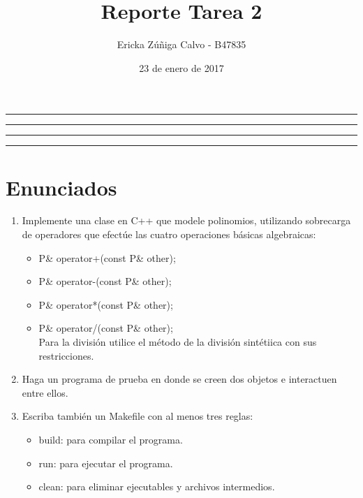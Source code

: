 \documentclass[11pt]{article}
\title{Reporte Tarea 2}
\author{Ericka Z\'u\~niga Calvo - B47835}
\date{23 de enero de 2017}
\begin{document}
\maketitle
\hrule
\hrule
\tableofcontents
\hspace{5mm}
\hrule
\hrule


\section{Enunciados}

\begin{enumerate}
\item Implemente una clase en C++ que modele polinomios, utilizando sobrecarga de operadores que efectúe las cuatro operaciones básicas algebraicas:

\begin{itemize}
\item P\& operator+(const P\& other);
\item P\& operator-(const P\& other);
\item P\& operator*(const P\& other);
\item P\& operator/(const P\& other);\\
Para la divisi\'on utilice el m\'etodo de la divisi\'on sint\'etiica con sus restricciones.
\end{itemize}

\item Haga un programa de prueba en donde se creen dos objetos e interactuen entre ellos.
\item Escriba tambi\'en un Makefile con al menos tres reglas:
\begin{itemize}
\item build: para compilar el programa.
\item run: para ejecutar el programa.
\item clean: para eliminar ejecutables y archivos intermedios.
\end{itemize}
\end{enumerate}
\end{document}
